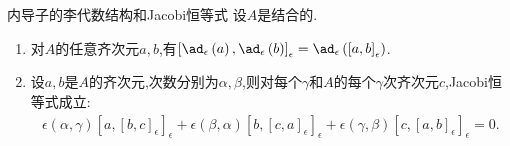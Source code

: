 \begin{corollary}{内导子的李代数结构和Jacobi恒等式}{}
	设$A$是结合的.
	\begin{enumerate}
		\item 对$A$的任意齐次元$a,b$,有$\left[\ad_{\epsilon}\left(a\right),\ad_{\epsilon}\left(b\right)\right]_{\epsilon}=\ad_{\epsilon}\left(\left[a,b\right]_{\epsilon}\right)$.
		\item 设$a,b$是$A$的齐次元,次数分别为$\alpha,\beta$,则对每个$\gamma$和$A$的每个$\gamma$次齐次元$c$,Jacobi恒等式成立:
		\begin{align*}
			\epsilon\left(\alpha,\gamma\right)\left[a,\left[b,c\right]_{\epsilon}\right]_{\epsilon}+\epsilon\left(\beta,\alpha\right)\left[b,\left[c,a\right]_{\epsilon}\right]_{\epsilon}+\epsilon\left(\gamma,\beta\right)\left[c,\left[a,b\right]_{\epsilon}\right]_{\epsilon}=0.
		\end{align*}
	\end{enumerate}
\end{corollary}










































































